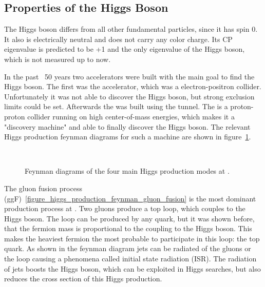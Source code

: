\subsection{Properties of the Higgs Boson}

The Higgs boson differs from all other fundamental particles, since it has spin 0. It also is electrically neutral and does
not carry any color charge. Its CP eigenvalue is predicted to be +1 and the only eigenvalue of the Higgs boson, which is
not measured up to now.

In the past ~50 years two accelerators were built with the main goal to find the Higgs boson. The first was the \LEP accelerator,
which was a electron-positron collider. Unfortunately it was not able to discover the Higgs boson, but strong exclusion limits
could be set. Afterwards the \LHC was built using the \LEP tunnel. The \LHC is a proton-proton collider running on high
center-of-mass energies, which makes it a "discovery machine" and able to finally discover the Higgs boson. The relevant Higgs production
feynman diagrams for such a machine are shown in figure~\ref{figure_higgs_production_feynman}.\\

\begin{figure}[h!]
\centering
\subfloat[ggF]{ \label{figure_higgs_production_feynman_gluon_fusion}
	\centering 
}
\hspace{0.05\textwidth}
\subfloat[VBF]{ \label{figure_higgs_production_feynman_vector_boson_fusion}
	\centering 
}
\\ \vspace{5mm}
\subfloat[VH]{ \label{figure_higgs_production_feynman_higgs_strahlung}
	\centering 
}
\hspace{0.05\textwidth}
\subfloat[ttH]{ \label{figure_higgs_production_feynman_associated_production}
	\centering 
}
\caption{Feynman diagrams of the four main Higgs production modes at \LHC.}
\label{figure_higgs_production_feynman}
\end{figure}

The gluon fusion process (ggF)~\ref{figure_higgs_production_feynman_gluon_fusion} is the most dominant production process at \LHC. Two gluons produce a top loop,
which couples to the Higgs boson. The loop can be produced by any quark, but it was shown before, that the fermion mass
is proportional to the coupling to the Higgs boson. This makes the heaviest fermion the most probable to participate in this loop:
the top quark. As shown in the feynman diagram jets can be radiated of the gluons or the loop causing a phenomena called
initial state radiation (ISR). The radiation of jets boosts the Higgs boson, which can be exploited in Higgs searches, but also reduces
the cross section of this Higgs production.

